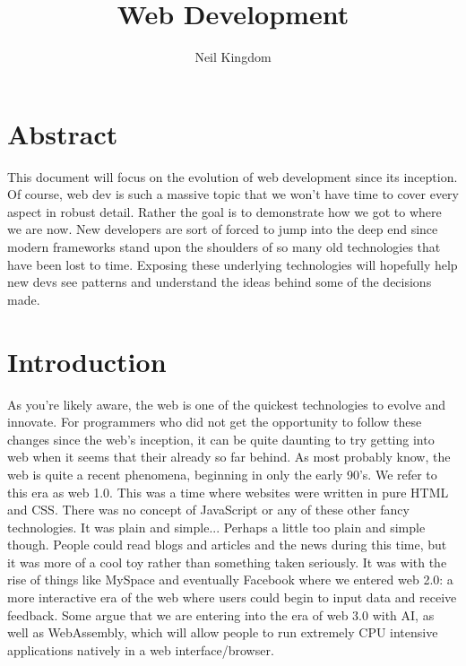 \documentclass{article}
\begin{document}
\renewcommand\maketitlehooka{\vfill}
\renewcommand\maketitlehookd{\vfill}

\begin{titlingpage}
    \title{Web Development}
    \author{Neil Kingdom}
    \maketitle
\end{titlingpage}

\newpage

\tableofcontents

\newpage

\section{Abstract}

This document will focus on the evolution of web development since its inception. Of course, web dev is such
a massive topic that we won't have time to cover every aspect in robust detail. Rather the goal is to
demonstrate how we got to where we are now. New developers are sort of forced to jump into the deep end since
modern frameworks stand upon the shoulders of so many old technologies that have been lost to time. Exposing
these underlying technologies will hopefully help new devs see patterns and understand the ideas behind some
of the decisions made.

\section{Introduction}

As you're likely aware, the web is one of the quickest technologies to evolve and innovate. For programmers
who did not get the opportunity to follow these changes since the web's inception, it can be quite daunting to
try getting into web when it seems that their already so far behind. As most probably know, the web is quite a
recent phenomena, beginning in only the early 90's. We refer to this era as web 1.0. This was a time where
websites were written in pure HTML and CSS. There was no concept of JavaScript or any of these other fancy
technologies. It was plain and simple... Perhaps a little too plain and simple though. People could read blogs
and articles and the news during this time, but it was more of a cool toy rather than something taken seriously.
It was with the rise of things like MySpace and eventually Facebook where we entered web 2.0: a more interactive
era of the web where users could begin to input data and receive feedback. Some argue that we are entering into
the era of web 3.0 with AI, as well as WebAssembly, which will allow people to run extremely CPU intensive
applications natively in a web interface/browser.
\end{document}
